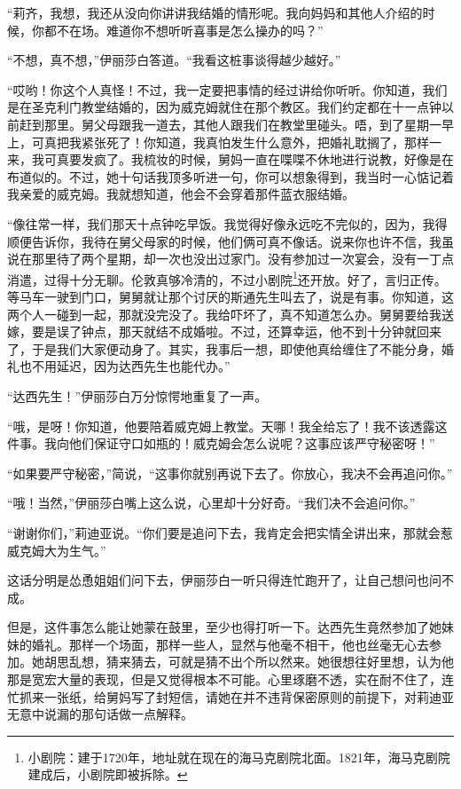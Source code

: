 \par “莉齐，我想，我还从没向你讲讲我结婚的情形呢。我向妈妈和其他人介绍的时候，你都不在场。难道你不想听听喜事是怎么操办的吗？”
\par “不想，真不想，”伊丽莎白答道。“我看这桩事谈得越少越好。”
\par “哎哟！你这个人真怪！不过，我一定要把事情的经过讲给你听听。你知道，我们是在圣克利门教堂结婚的，因为威克姆就住在那个教区。我们约定都在十一点钟以前赶到那里。舅父母跟我一道去，其他人跟我们在教堂里碰头。唔，到了星期一早上，可真把我紧张死了！你知道，我真怕发生什么意外，把婚礼耽搁了，那样一来，我可真要发疯了。我梳妆的时候，舅妈一直在喋喋不休地进行说教，好像是在布道似的。不过，她十句话我顶多听进一句，你可以想象得到，我当时一心惦记着我亲爱的威克姆。我就想知道，他会不会穿着那件蓝衣服结婚。
\par “像往常一样，我们那天十点钟吃早饭。我觉得好像永远吃不完似的，因为，我得顺便告诉你，我待在舅父母家的时候，他们俩可真不像话。说来你也许不信，我虽说在那里待了两个星期，却一次也没出过家门。没有参加过一次宴会，没有一丁点消遣，过得十分无聊。伦敦真够冷清的，不过小剧院\footnote{小剧院：建于1720年，地址就在现在的海马克剧院北面。1821年，海马克剧院建成后，小剧院即被拆除。}还开放。好了，言归正传。等马车一驶到门口，舅舅就让那个讨厌的斯通先生叫去了，说是有事。你知道，这两个人一碰到一起，那就没完没了。我给吓坏了，真不知道怎么办。舅舅要给我送嫁，要是误了钟点，那天就结不成婚啦。不过，还算幸运，他不到十分钟就回来了，于是我们大家便动身了。其实，我事后一想，即使他真给缠住了不能分身，婚礼也不用延迟，因为达西先生也能代办。”
\par “达西先生！”伊丽莎白万分惊愕地重复了一声。
\par “哦，是呀！你知道，他要陪着威克姆上教堂。天哪！我全给忘了！我不该透露这件事。我向他们保证守口如瓶的！威克姆会怎么说呢？这事应该严守秘密呀！”
\par “如果要严守秘密，”简说，“这事你就别再说下去了。你放心，我决不会再追问你。”
\par “哦！当然，”伊丽莎白嘴上这么说，心里却十分好奇。“我们决不会追问你。”
\par “谢谢你们，”莉迪亚说。“你们要是追问下去，我肯定会把实情全讲出来，那就会惹威克姆大为生气。”
\par 这话分明是怂恿姐姐们问下去，伊丽莎白一听只得连忙跑开了，让自己想问也问不成。
\par 但是，这件事怎么能让她蒙在鼓里，至少也得打听一下。达西先生竟然参加了她妹妹的婚礼。那样一个场面，那样一些人，显然与他毫不相干，他也丝毫无心去参加。她胡思乱想，猜来猜去，可就是猜不出个所以然来。她很想往好里想，认为他那是宽宏大量的表现，但是又觉得根本不可能。心里琢磨不透，实在耐不住了，连忙抓来一张纸，给舅妈写了封短信，请她在并不违背保密原则的前提下，对莉迪亚无意中说漏的那句话做一点解释。
